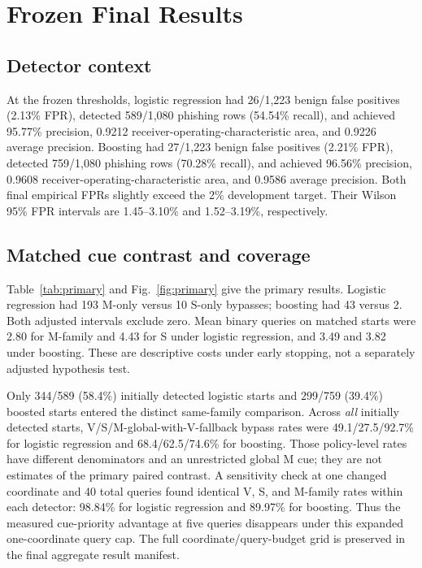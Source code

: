 \documentclass{ieeeaccess}
\begin{document}
\section{Frozen Final Results}
\subsection{Detector context}
At the frozen thresholds, logistic regression had 26/1,223 benign false positives (2.13\% FPR), detected 589/1,080 phishing rows (54.54\% recall), and achieved 95.77\% precision, 0.9212 receiver-operating-characteristic area, and 0.9226 average precision. Boosting had 27/1,223 benign false positives (2.21\% FPR), detected 759/1,080 phishing rows (70.28\% recall), and achieved 96.56\% precision, 0.9608 receiver-operating-characteristic area, and 0.9586 average precision. Both final empirical FPRs slightly exceed the 2\% development target. Their Wilson 95\% FPR intervals are 1.45--3.10\% and 1.52--3.19\%, respectively.



\subsection{Matched cue contrast and coverage}
Table~\ref{tab:primary} and Fig.~\ref{fig:primary} give the primary results. Logistic regression had 193 M-only versus 10 S-only bypasses; boosting had 43 versus 2. Both adjusted intervals exclude zero. Mean binary queries on matched starts were 2.80 for M-family and 4.43 for S under logistic regression, and 3.49 and 3.82 under boosting. These are descriptive costs under early stopping, not a separately adjusted hypothesis test.



Only 344/589 (58.4\%) initially detected logistic starts and 299/759 (39.4\%) boosted starts entered the distinct same-family comparison. Across \emph{all} initially detected starts, V/S/M-global-with-V-fallback bypass rates were 49.1/27.5/92.7\% for logistic regression and 68.4/62.5/74.6\% for boosting. Those policy-level rates have different denominators and an unrestricted global M cue; they are not estimates of the primary paired contrast. A sensitivity check at one changed coordinate and 40 total queries found identical V, S, and M-family rates within each detector: 98.84\% for logistic regression and 89.97\% for boosting. Thus the measured cue-priority advantage at five queries disappears under this expanded one-coordinate query cap. The full coordinate/query-budget grid is preserved in the final aggregate result manifest.
\end{document}
